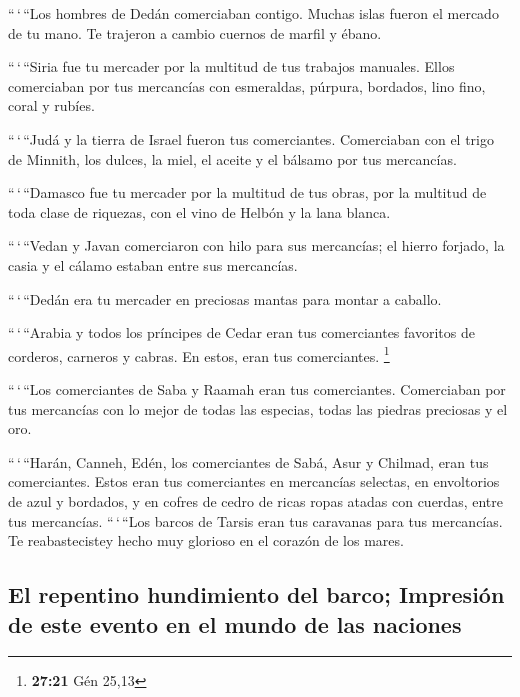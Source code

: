  ``\,`\,``Los hombres de Dedán comerciaban contigo.
Muchas islas fueron el mercado de tu mano. Te trajeron a cambio cuernos
de marfil y ébano.

 ``\,`\,``Siria fue tu mercader por la multitud de tus
trabajos manuales. Ellos comerciaban por tus mercancías con esmeraldas,
púrpura, bordados, lino fino, coral y rubíes.

 ``\,`\,``Judá y la tierra de Israel fueron tus
comerciantes. Comerciaban con el trigo de Minnith, los dulces, la miel,
el aceite y el bálsamo por tus mercancías.

 ``\,`\,``Damasco fue tu mercader por la multitud de tus
obras, por la multitud de toda clase de riquezas, con el vino de Helbón
y la lana blanca.

 ``\,`\,``Vedan y Javan comerciaron con hilo para sus
mercancías; el hierro forjado, la casia y el cálamo estaban entre sus
mercancías.

 ``\,`\,``Dedán era tu mercader en preciosas mantas para
montar a caballo.

 ``\,`\,``Arabia y todos los príncipes de Cedar eran tus
comerciantes favoritos de corderos, carneros y cabras. En estos, eran
tus comerciantes. \footnote{\textbf{27:21} Gén 25,13}

 ``\,`\,``Los comerciantes de Saba y Raamah eran tus
comerciantes. Comerciaban por tus mercancías con lo mejor de todas las
especias, todas las piedras preciosas y el oro.

 ``\,`\,``Harán, Canneh, Edén, los comerciantes de Sabá,
Asur y Chilmad, eran tus comerciantes.  Estos eran tus
comerciantes en mercancías selectas, en envoltorios de azul y bordados,
y en cofres de cedro de ricas ropas atadas con cuerdas, entre tus
mercancías.  ``\,`\,``Los barcos de Tarsis eran tus
caravanas para tus mercancías. Te reabastecistey hecho muy glorioso en
el corazón de los mares.

\hypertarget{el-repentino-hundimiento-del-barco-impresiuxf3n-de-este-evento-en-el-mundo-de-las-naciones}{%
\subsection{El repentino hundimiento del barco; Impresión de este evento
en el mundo de las
naciones}\label{el-repentino-hundimiento-del-barco-impresiuxf3n-de-este-evento-en-el-mundo-de-las-naciones}}

